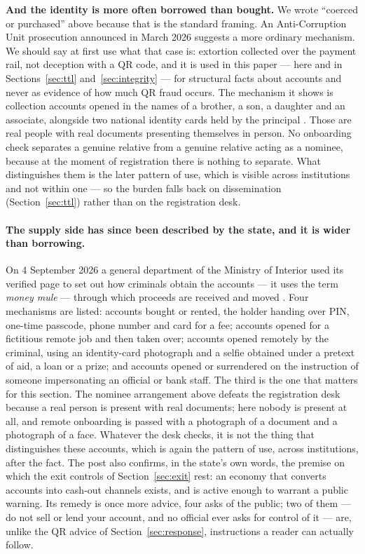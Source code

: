 \documentclass[10pt,a4paper,twocolumn]{article}
\begin{document}
\textbf{And the identity is more often borrowed than bought.} We wrote
``coerced or purchased'' above because that is the standard framing. An
Anti-Corruption Unit prosecution announced in March 2026 suggests a more
ordinary mechanism. We should say at first use what that case is: extortion
collected over the payment rail, not deception with a QR code, and it is used
in this paper --- here and in Sections~\ref{sec:ttl} and~\ref{sec:integrity}
--- for structural facts about accounts and never as evidence of how much QR
fraud occurs. The mechanism it shows is collection accounts opened in the names of a brother, a son, a
daughter and an associate, alongside two national identity cards held by the
principal \citep{cambodianess2026kohkong}. Those are real people with real
documents presenting themselves in person. No onboarding check separates a
genuine relative from a genuine relative acting as a nominee, because at the
moment of registration there is nothing to separate. What distinguishes them is
the later pattern of use, which is visible across institutions and not within
one --- so the burden falls back on dissemination
(Section~\ref{sec:ttl}) rather than on the registration desk.

\paragraph{The supply side has since been described by the state, and it is
wider than borrowing.} On 4 September 2026 a general department of the Ministry
of Interior used its verified page to set out how criminals obtain the accounts
--- it uses the term \emph{money mule} --- through which proceeds are received
and moved \citep{moi2026mule}. Four mechanisms are listed: accounts bought or
rented, the holder handing over PIN, one-time passcode, phone number and card
for a fee; accounts opened for a fictitious remote job and then taken over;
accounts opened remotely by the criminal, using an identity-card photograph and
a selfie obtained under a pretext of aid, a loan or a prize; and accounts opened
or surrendered on the instruction of someone impersonating an official or bank
staff. The third is the one that matters for this section. The nominee
arrangement above defeats the registration desk because a real person is
present with real documents; here nobody is present at all, and remote
onboarding is passed with a photograph of a document and a photograph of a
face. Whatever the desk checks, it is not the thing that distinguishes these
accounts, which is again the pattern of use, across institutions, after the
fact. The post also confirms, in the state's own words, the premise on which
the exit controls of Section~\ref{sec:exit} rest: an economy that converts
accounts into cash-out channels exists, and is active enough to warrant a
public warning. Its remedy is once more advice, four asks of the public; two
of them --- do not sell or lend your account, and no official ever asks for
control of it --- are, unlike the QR advice of Section~\ref{sec:response},
instructions a reader can actually follow.
\end{document}
